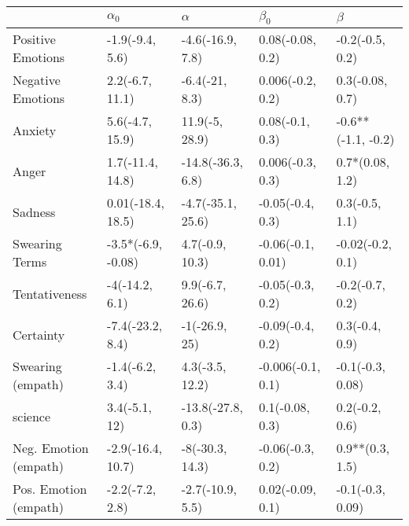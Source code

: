 \begin{tabular}{lllll}
\toprule
{} &          $\alpha_0$ &           $\alpha$ &          $\beta_0$ &             $\beta$ \\
\midrule
Positive Emotions     &     -1.9(-9.4, 5.6) &   -4.6(-16.9, 7.8) &   0.08(-0.08, 0.2) &     -0.2(-0.5, 0.2) \\
Negative Emotions     &     2.2(-6.7, 11.1) &     -6.4(-21, 8.3) &   0.006(-0.2, 0.2) &     0.3(-0.08, 0.7) \\
Anxiety               &     5.6(-4.7, 15.9) &     11.9(-5, 28.9) &    0.08(-0.1, 0.3) &  -0.6**(-1.1, -0.2) \\
Anger                 &    1.7(-11.4, 14.8) &  -14.8(-36.3, 6.8) &   0.006(-0.3, 0.3) &     0.7*(0.08, 1.2) \\
Sadness               &   0.01(-18.4, 18.5) &  -4.7(-35.1, 25.6) &   -0.05(-0.4, 0.3) &      0.3(-0.5, 1.1) \\
Swearing Terms        &  -3.5*(-6.9, -0.08) &    4.7(-0.9, 10.3) &  -0.06(-0.1, 0.01) &    -0.02(-0.2, 0.1) \\
Tentativeness         &      -4(-14.2, 6.1) &    9.9(-6.7, 26.6) &   -0.05(-0.3, 0.2) &     -0.2(-0.7, 0.2) \\
Certainty             &    -7.4(-23.2, 8.4) &      -1(-26.9, 25) &   -0.09(-0.4, 0.2) &      0.3(-0.4, 0.9) \\
Swearing (empath)     &     -1.4(-6.2, 3.4) &    4.3(-3.5, 12.2) &  -0.006(-0.1, 0.1) &    -0.1(-0.3, 0.08) \\
science               &       3.4(-5.1, 12) &  -13.8(-27.8, 0.3) &    0.1(-0.08, 0.3) &      0.2(-0.2, 0.6) \\
Neg. Emotion (empath) &   -2.9(-16.4, 10.7) &    -8(-30.3, 14.3) &   -0.06(-0.3, 0.2) &     0.9**(0.3, 1.5) \\
Pos. Emotion (empath) &     -2.2(-7.2, 2.8) &   -2.7(-10.9, 5.5) &   0.02(-0.09, 0.1) &    -0.1(-0.3, 0.09) \\
\bottomrule
\end{tabular}
